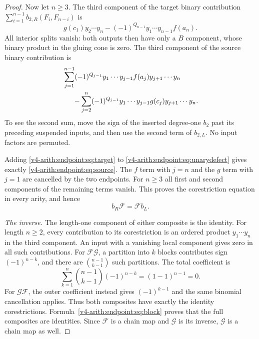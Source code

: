 \begin{proof}
Now let $n\geq3$. The third component of the target binary contribution
$\sum_{i=1}^{n-1}b_{2,R}(F_i,F_{n-i})$ is
\begin{equation}\label{v4-arith:endpoint:eq:target}
 g(c_1)y_2\cdots y_n
 -(-1)^{Q_{n-1}}y_1\cdots y_{n-1}f(a_n).
\end{equation}
All interior splits vanish: both outputs then have only a $B$ component, whose binary product in the gluing cone is zero. The third component of the source binary contribution is
\begin{align}\label{v4-arith:endpoint:eq:source}
 &\sum_{j=1}^{n-1}(-1)^{Q_{j-1}}
 y_1\cdots y_{j-1} f(a_j)y_{j+1}\cdots y_n\notag\\
 &\hspace{5mm}-\sum_{j=2}^{n}(-1)^{Q_{j-1}}
 y_1\cdots y_{j-1} g(c_j)y_{j+1}\cdots y_n.
\end{align}
To see the second sum, move the sign of the inserted degree-one $b_2$ past its preceding suspended inputs, and then use the second term of $b_{2,L}$. No input factors are permuted.

Adding \eqref{v4-arith:endpoint:eq:target} to \eqref{v4-arith:endpoint:eq:unarydefect} gives exactly \eqref{v4-arith:endpoint:eq:source}. The $f$ term with $j=n$ and the $g$ term with $j=1$ are cancelled by the two endpoints. For $n\geq3$ all first and second components of the remaining terms vanish. This proves the corestriction equation in every arity, and hence
\[
 b_R\mathcal{F}=\mathcal{F} b_L.
\]

\emph{The inverse.}
The length-one component of either composite is the identity. For length $n\geq2$, every contribution to its corestriction is an ordered product $y_1\cdots y_n$ in the third component. An input with a vanishing local component gives zero in all such contributions. For $\mathcal{F}\mathcal{G}$, a partition into $k$ blocks contributes sign $(-1)^{n-k}$, and there are $\binom{n-1}{k-1}$ such partitions. The total coefficient is
\[
 \sum_{k=1}^n\binom{n-1}{k-1}(-1)^{n-k}=(1-1)^{n-1}=0.
\]
For $\mathcal{G}\mathcal{F}$, the outer coefficient instead gives $(-1)^{k-1}$ and the same binomial cancellation applies. Thus both composites have exactly the identity corestrictions. Formula~\eqref{v4-arith:endpoint:eq:block} proves that the full composites are identities. Since $\mathcal{F}$ is a chain map and $\mathcal{G}$ is its inverse, $\mathcal{G}$ is a chain map as well. \end{proof}

